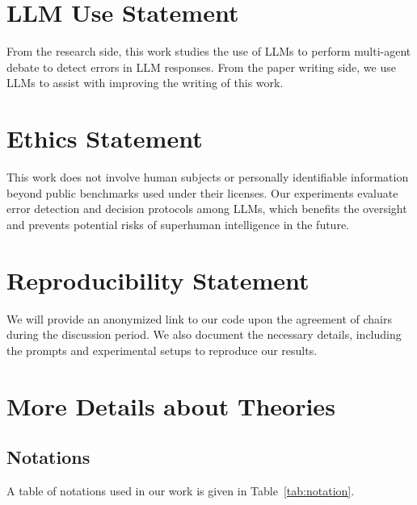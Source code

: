 \documentclass{article} %
\begin{document}





\clearpage
\onecolumn
\appendix

\section*{LLM Use Statement}
From the research side, this work studies the use of LLMs to perform multi-agent debate to detect errors in LLM responses. From the paper writing side, we use LLMs to assist with improving the writing of this work.

\section*{Ethics Statement}
This work does not involve human subjects or personally identifiable information beyond public benchmarks used under their licenses. Our experiments evaluate error detection and decision protocols among LLMs, which benefits the oversight and prevents potential risks of superhuman intelligence in the future.

\section*{Reproducibility Statement}
We will provide an anonymized link to our code upon the agreement of chairs during the discussion period. We also document the necessary details, including the prompts and experimental setups to reproduce our results.

\section{More Details about Theories}
\label{appdx:theory}

\subsection{Notations}
A table of notations used in our work is given in Table~\ref{tab:notation}.
\end{document}
